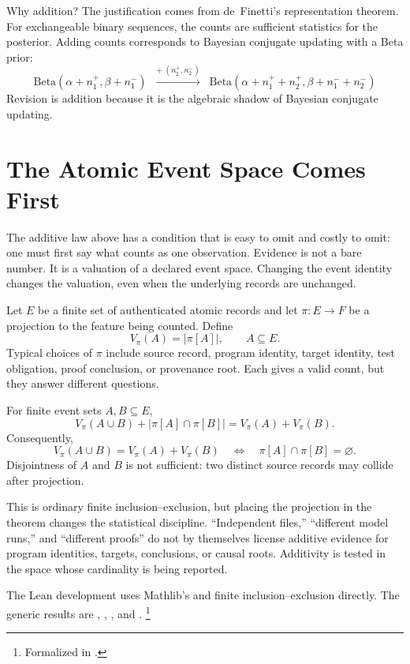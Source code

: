 \documentclass[11pt,openany]{report}
\begin{document}
Why addition?  The justification comes from de~Finetti's
representation theorem.  For exchangeable binary sequences, the counts
are sufficient statistics for the posterior.  Adding counts corresponds to
Bayesian conjugate updating with a Beta prior:
\[
  \text{Beta}(\alpha + n_1^+, \beta + n_1^-)
  \;\;\xrightarrow{+\;(n_2^+, n_2^-)}\;\;
  \text{Beta}(\alpha + n_1^+ + n_2^+, \beta + n_1^- + n_2^-)
\]
Revision is addition because it is the algebraic shadow of Bayesian
conjugate updating.

\section{The Atomic Event Space Comes First}
\label{sec:atomic-event-space}

The additive law above has a condition that is easy to omit and costly to
omit: one must first say what counts as one observation.  Evidence is not a
bare number.  It is a valuation of a declared event space.  Changing the
event identity changes the valuation, even when the underlying records are
unchanged.

Let $E$ be a finite set of authenticated atomic records and let
$\pi:E\to F$ be a projection to the feature being counted.  Define
\[
  V_\pi(A) = |\pi[A]|,\qquad A\subseteq E.
\]
Typical choices of $\pi$ include source record, program identity, target
identity, test obligation, proof conclusion, or provenance root.  Each gives
a valid count, but they answer different questions.

\begin{theorem}
\label{thm:projected-valuation-law}
For finite event sets $A,B\subseteq E$,
\[
  V_\pi(A\cup B)+|\pi[A]\cap\pi[B]|=V_\pi(A)+V_\pi(B).
\]
Consequently,
\[
  V_\pi(A\cup B)=V_\pi(A)+V_\pi(B)
  \quad\Longleftrightarrow\quad
  \pi[A]\cap\pi[B]=\varnothing.
\]
Disjointness of $A$ and $B$ is not sufficient: two distinct source records
may collide after projection.
\end{theorem}

This is ordinary finite inclusion--exclusion, but placing the projection in
the theorem changes the statistical discipline.  ``Independent files,''
``different model runs,'' and ``different proofs'' do not by themselves
license additive evidence for program identities, targets, conclusions, or
causal roots.  Additivity is tested in the space whose cardinality is being
reported.

The Lean development uses Mathlib's  and finite
inclusion--exclusion directly.  The generic results are
,
,
, and
.%
\footnote{Formalized in
.}
\end{document}
